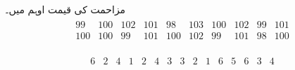 \quad مزاحمت کی قیمت اوہم  میں۔
\begin{align*}
\begin{array}{rrrrrrrrrr}
99&100&102&101&98&103&100&102&99&101\\
100&100&99&101&100&102&99&101&98&100
\end{array}
\end{align*}

\quad 
\begin{align*}
\begin{array}{rrrrrrrrrrrrrrr}
6& 2& 4& 1& 2& 4& 3& 3& 2& 1& 6& 5& 6& 3& 4
\end{array}
\end{align*}

